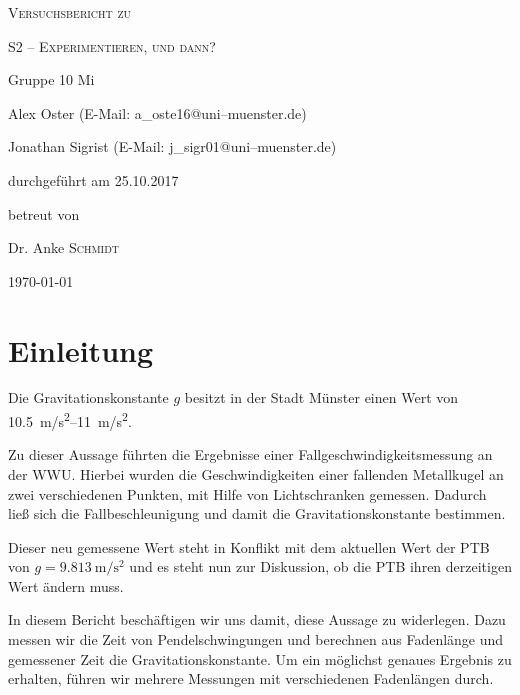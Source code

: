 \documentclass[11pt,a4paper,titlepage, ngerman]{article}
\begin{document}
	
	\begin{titlepage}
		\centering
		{\scshape\LARGE Versuchsbericht zu \par}
		\vspace{1cm}
		{\scshape\huge S2 -- Experimentieren, und dann?\par}
		\vspace{2.5cm}
		{\LARGE Gruppe 10 Mi\par}
		\vspace{0.5cm}
		{\large Alex Oster (E-Mail: a\_oste16@uni--muenster.de) \par}
		{\large Jonathan Sigrist (E-Mail: j\_sigr01@uni--muenster.de) \par}
		\vfill
		durchgeführt am 25.10.2017\par
		betreut von\par
		{\large Dr. Anke \textsc{Schmidt}}
		
		\vfill
		
		{\large \today\par}
	\end{titlepage}
		
	\tableofcontents
	
	\newpage
	
	\section{Einleitung}
		\label{Einleitung}
		
		
		\glqq Die Gravitationskonstante $g$ besitzt in der Stadt Münster einen Wert von \SIrange{10,5}{11}{m/s^2}.\grqq
		
		Zu dieser Aussage führten die Ergebnisse einer Fallgeschwindigkeitsmessung an der WWU.
		Hierbei wurden die Geschwindigkeiten einer fallenden Metallkugel an zwei verschiedenen Punkten, mit Hilfe von Lichtschranken gemessen. Dadurch ließ sich die Fallbeschleunigung und damit die Gravitationskonstante bestimmen.
		
		Dieser neu gemessene Wert steht in Konflikt mit dem aktuellen Wert der PTB von $g = \SI{9.813}{\meter\per\second\squared}$ und es steht nun zur Diskussion, ob die PTB ihren derzeitigen Wert ändern muss.
		
		In diesem Bericht beschäftigen wir uns damit, diese Aussage zu widerlegen.
		Dazu messen wir die Zeit von Pendelschwingungen und berechnen aus Fadenlänge und gemessener Zeit die Gravitationskonstante. Um ein möglichst genaues Ergebnis zu erhalten, führen wir mehrere Messungen mit verschiedenen Fadenlängen durch.
		
\end{document}
